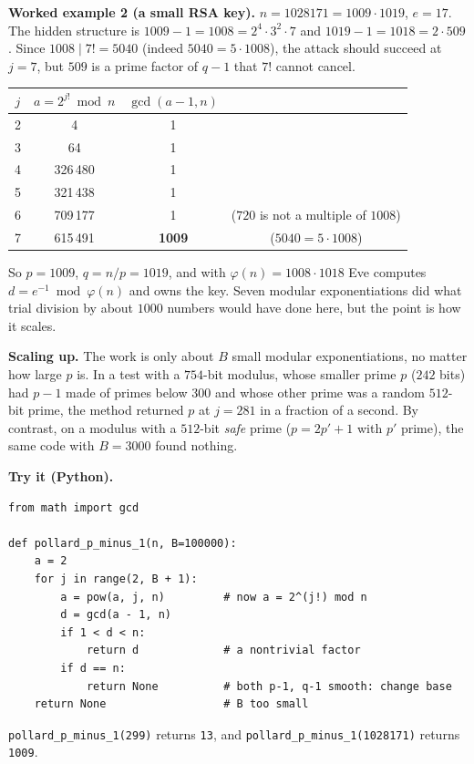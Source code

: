 \documentclass[11pt]{article}
\begin{document}
\textbf{Worked example 2 (a small RSA key).} $n=1028171=1009\cdot1019$, $e=17$. The hidden structure is $1009-1=1008=2^4\cdot3^2\cdot7$ and $1019-1=1018=2\cdot509$. Since $1008\mid7!=5040$ (indeed $5040=5\cdot1008$), the attack should succeed at $j=7$, but $509$ is a prime factor of $q-1$ that $7!$ cannot cancel.
\begin{center}
\begin{tabular}{@{}cccc@{}}
\toprule
$j$ & $a=2^{j!}\bmod n$ & $\gcd(a-1,n)$ & \\
\midrule
2 & 4 & 1 & \\
3 & 64 & 1 & \\
4 & 326\,480 & 1 & \\
5 & 321\,438 & 1 & \\
6 & 709\,177 & 1 & ($720$ is not a multiple of $1008$) \\
7 & 615\,491 & \textbf{1009} & ($5040=5\cdot1008$) \\
\bottomrule
\end{tabular}
\end{center}
So $p=1009$, $q=n/p=1019$, and with $\varphi(n)=1008\cdot1018$ Eve computes $d=e^{-1}\bmod\varphi(n)$ and owns the key. Seven modular exponentiations did what trial division by about $1000$ numbers would have done here, but the point is how it scales.

\textbf{Scaling up.} The work is only about $B$ small modular exponentiations, no matter how large $p$ is. In a test with a $754$-bit modulus, whose smaller prime $p$ ($242$ bits) had $p-1$ made of primes below $300$ and whose other prime was a random $512$-bit prime, the method returned $p$ at $j=281$ in a fraction of a second. By contrast, on a modulus with a $512$-bit \emph{safe} prime ($p=2p'+1$ with $p'$ prime), the same code with $B=3000$ found nothing.

\textbf{Try it (Python).}
\begin{verbatim}
from math import gcd

def pollard_p_minus_1(n, B=100000):
    a = 2
    for j in range(2, B + 1):
        a = pow(a, j, n)         # now a = 2^(j!) mod n
        d = gcd(a - 1, n)
        if 1 < d < n:
            return d             # a nontrivial factor
        if d == n:
            return None          # both p-1, q-1 smooth: change base
    return None                  # B too small
\end{verbatim}
\texttt{pollard\_p\_minus\_1(299)} returns \texttt{13}, and \texttt{pollard\_p\_minus\_1(1028171)} returns \texttt{1009}.
\end{document}
